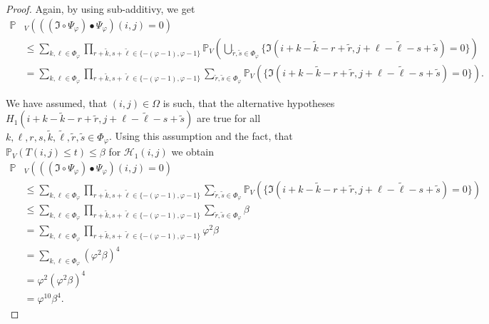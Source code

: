 \documentclass[a4paper,12pt]{article}
\theoremstyle{plain}
\theoremstyle{definition}
\begin{document}
\begin{appendix}
\begin{proof}
		Again, by using sub-additivy, we get
		\begin{align*}
			\mathbb{P}&_V\left( ((\mathfrak{I} \circ \Psi_\varphi) \bullet \Psi_\varphi)(i, j) = 0 \right) \\
			&\leq \sum_{k, \ell \in \Phi_\varphi} \prod_{r + \tilde{k}, s + \tilde{\ell} \in \{ - ( \varphi - 1 ), \varphi - 1 \}} \mathbb{P}_V\left( \bigcup_{\tilde{r}, \tilde{s} \in \Phi_\varphi} \{ \mathfrak{I}(i + k - \tilde{k} - r + \tilde{r}, j + \ell - \tilde{\ell} - s + \tilde{s}) = 0 \} \right) \\
			&= \sum_{k, \ell \in \Phi_\varphi} \prod_{r + \tilde{k}, s + \tilde{\ell} \in \{ - ( \varphi - 1 ), \varphi - 1 \}} \sum_{\tilde{r}, \tilde{s} \in \Phi_\varphi} \mathbb{P}_V\left( \{ \mathfrak{I}(i + k - \tilde{k} - r + \tilde{r}, j + \ell - \tilde{\ell} - s + \tilde{s}) = 0 \} \right).
		\end{align*}
		
		We have assumed, that $(i, j) \in \Omega$ is such, that the alternative hypotheses $H_1(i + k - \tilde{k} - r + \tilde{r}, j + \ell - \tilde{\ell} - s + \tilde{s})$ are true for all $k, \ell, r, s, \tilde{k}, \tilde{\ell}, \tilde{r}, \tilde{s} \in \Phi_\varphi$. Using this assumption and the fact, that $\mathbb{P}_V\left( T(i, j) \leq t \right) \leq \beta$ for $\mathcal{H}_1(i, j)$ we obtain
		\begin{align*}
			\mathbb{P}&_V\left( ((\mathfrak{I} \circ \Psi_\varphi) \bullet \Psi_\varphi)(i, j) = 0 \right) \\
			&\leq \sum_{k, \ell \in \Phi_\varphi} \prod_{r + \tilde{k}, s + \tilde{\ell} \in \{ - ( \varphi - 1 ), \varphi - 1 \}} \sum_{\tilde{r}, \tilde{s} \in \Phi_\varphi} \mathbb{P}_V\left( \{ \mathfrak{I}(i + k - \tilde{k} - r + \tilde{r}, j + \ell - \tilde{\ell} - s + \tilde{s}) = 0 \} \right) \\
			&\leq \sum_{k, \ell \in \Phi_\varphi} \prod_{r + \tilde{k}, s + \tilde{\ell} \in \{ - ( \varphi - 1 ), \varphi - 1 \}} \sum_{\tilde{r}, \tilde{s} \in \Phi_\varphi} \beta \\
			&= \sum_{k, \ell \in \Phi_\varphi} \prod_{r + \tilde{k}, s + \tilde{\ell} \in \{ - ( \varphi - 1 ), \varphi - 1 \}} \varphi^2 \beta \\
			&= \sum_{k, \ell \in \Phi_\varphi} ( \varphi^2 \beta )^4 \\
			&= \varphi^2 ( \varphi^2 \beta )^4 \\
			&= \varphi^{10} \beta^4.
		\end{align*}
		

\end{proof}
\end{appendix}
\end{document}
